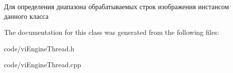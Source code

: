 Для определения диапазона обрабатываемых строк изображения инстансом данного класса 



The documentation for this class was generated from the following files\+:\begin{DoxyCompactItemize}
\item 
code/vi\+Engine\+Thread.\+h\item 
code/vi\+Engine\+Thread.\+cpp\end{DoxyCompactItemize}

